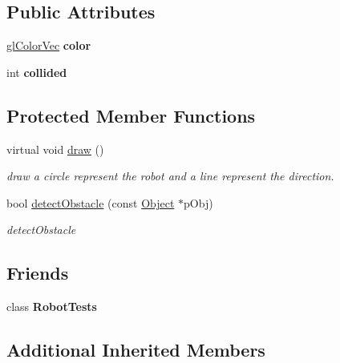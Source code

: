 \subsection*{Public Attributes}
\begin{DoxyCompactItemize}
\item 
\hypertarget{classRobotClass_ad1c37dd20e2049c9f083d44ab05f34e2}{\hyperlink{Common_8h_a5113b6588451c418d38d8b3681eb6040}{gl\-Color\-Vec} {\bfseries color}}\label{classRobotClass_ad1c37dd20e2049c9f083d44ab05f34e2}

\item 
\hypertarget{classRobotClass_a34bfb4f398462a875ec7f1f213beb6f1}{int {\bfseries collided}}\label{classRobotClass_a34bfb4f398462a875ec7f1f213beb6f1}

\end{DoxyCompactItemize}
\subsection*{Protected Member Functions}
\begin{DoxyCompactItemize}
\item 
virtual void \hyperlink{classRobotClass_af49350c7e914e11df672cc9de68c9ff1}{draw} ()
\begin{DoxyCompactList}\small\item\em draw a circle represent the robot and a line represent the direction. \end{DoxyCompactList}\item 
bool \hyperlink{classRobotClass_a480964a3187868d543c0c1f1cf998162}{detect\-Obstacle} (const \hyperlink{classObject}{Object} $\ast$p\-Obj)
\begin{DoxyCompactList}\small\item\em detect\-Obstacle \end{DoxyCompactList}\end{DoxyCompactItemize}
\subsection*{Friends}
\begin{DoxyCompactItemize}
\item 
\hypertarget{classRobotClass_a02448c8c195e97f3229c6803f47bf8d7}{class {\bfseries Robot\-Tests}}\label{classRobotClass_a02448c8c195e97f3229c6803f47bf8d7}

\end{DoxyCompactItemize}
\subsection*{Additional Inherited Members}


